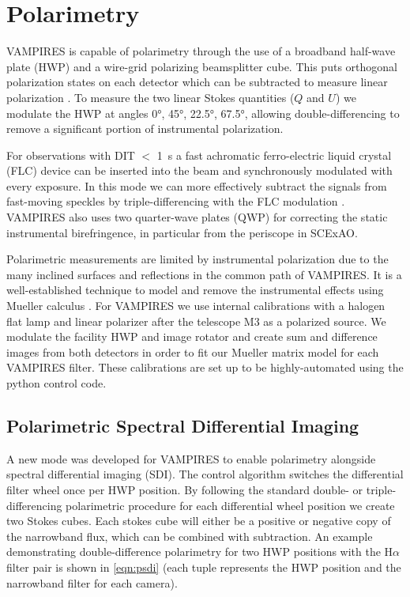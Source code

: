 \section{Polarimetry}\label{sec:polarimetry}

VAMPIRES is capable of polarimetry through the use of a broadband half-wave plate (HWP) and a wire-grid polarizing beamsplitter cube. This puts orthogonal polarization states on each detector which can be subtracted to measure linear polarization \citep{kuhn_imaging_2001}. To measure the two linear Stokes quantities ($Q$ and $U$) we modulate the HWP at angles \ang{0}, \ang{45}, \ang{22.5}, \ang{67.5}, allowing double-differencing to remove a significant portion of instrumental polarization.

For observations with DIT $<$ \SI{1}{\second} a fast achromatic ferro-electric liquid crystal (FLC) device can be inserted into the beam and synchronously modulated with every exposure. In this mode we can more effectively subtract the signals from fast-moving speckles by triple-differencing with the FLC modulation \citep{norris_vampires_2015}. VAMPIRES also uses two quarter-wave plates (QWP) for correcting the static instrumental birefringence, in particular from the periscope in SCExAO.

Polarimetric measurements are limited by instrumental polarization due to the many inclined surfaces and reflections in the common path of VAMPIRES. It is a well-established technique to model and remove the instrumental effects using Mueller calculus \citep{holstein_polarimetric_2020,joost_t_hart_full_2021}. For VAMPIRES we use internal calibrations with a halogen flat lamp and linear polarizer after the telescope M3 as a polarized source. We modulate the facility HWP and image rotator and create sum and difference images from both detectors in order to fit our Mueller matrix model for each VAMPIRES filter.  These calibrations are set up to be highly-automated using the python control code. 

\subsection{Polarimetric Spectral Differential Imaging}

A new mode was developed for VAMPIRES to enable polarimetry alongside spectral differential imaging (SDI). The control algorithm switches the differential filter wheel once per HWP position. By following the standard double- or triple-differencing polarimetric procedure for each differential wheel position we create two Stokes cubes. Each stokes cube will either be a positive or negative copy of the narrowband flux, which can be combined with subtraction. An example demonstrating double-difference polarimetry for two HWP positions with the H$\alpha$ filter pair is shown in \autoref{eqn:psdi} (each tuple represents the HWP position and the narrowband filter for each camera).

